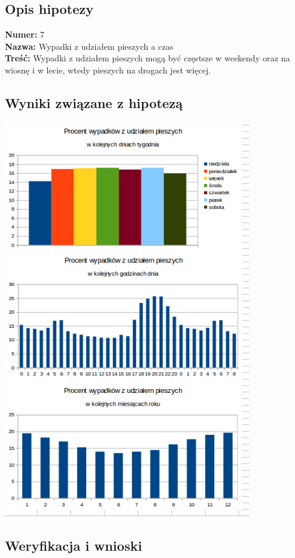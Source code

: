 \subsection{Opis hipotezy}\label{opis-hipotezy}

\textbf{Numer:} 7\\\textbf{Nazwa:} Wypadki z udziałem pieszych a
czas\\\textbf{Treść:} Wypadki z udziałem pieszych mogą być częstsze w
weekendy oraz na wiosnę i w lecie, wtedy pieszych na drogach jest
więcej.

\subsection{Wyniki związane z
hipotezą}\label{wyniki-zwiazane-z-hipoteza}

\includegraphics[width=0.8\textwidth]{images/hipotheses/pedestrians/pedestrians.png}

\subsection{Weryfikacja i wnioski}\label{weryfikacja-i-wnioski}

